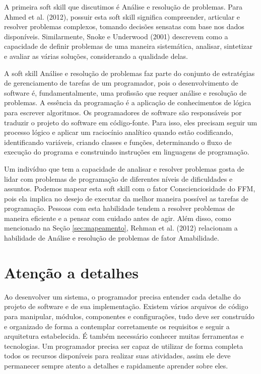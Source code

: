 A primeira soft skill que discutimos é Análise e resolução de problemas. Para Ahmed et al. (2012)\nocite{ahmed:12}, possuir esta soft skill significa compreender, articular e resolver problemas complexos, tomando decisões sensatas com base nos dados disponíveis. Similarmente, Snoke e Underwood (2001)\nocite{snoke:01} descrevem como a capacidade de definir problemas de uma maneira sistemática, analisar, sintetizar e avaliar as várias soluções, considerando a qualidade delas. 

A soft skill Análise e resolução de problemas faz parte do conjunto de estratégias de gerenciamento de tarefas de um programador, pois o desenvolvimento de software é, fundamentalmente, uma profissão que requer análise e resolução de problemas. A essência da programação é a aplicação de conhecimentos de lógica para escrever algoritmos. Os programadores de software são responsáveis por traduzir o projeto do software em código-fonte. Para isso, eles precisam seguir um processo lógico e aplicar um raciocínio analítico quando estão codificando, identificando variáveis, criando classes e funções, determinando o fluxo de execução do programa e construindo instruções em linguagens de programação. 

Um indivíduo que tem a capacidade de analisar e resolver problemas gosta de lidar com problemas de programação de diferentes níveis de dificuldades e assuntos.
Podemos mapear esta soft skill com o fator Conscienciosidade do FFM, pois ela implica no desejo de executar da melhor maneira possível as tarefas de programação.
Pessoas com esta habilidade tendem a resolver problemas de maneira eficiente e a pensar com cuidado antes de agir.
Além disso, como mencionado na Seção \ref{sec:mapeamento}, Rehman et al. (2012)\nocite{rehman:12}
relacionam a habilidade de Análise e resolução de problemas de fator Amabilidade.

\section{Atenção a detalhes}

Ao desenvolver um sistema, o programador precisa entender cada detalhe do projeto de software e de sua implementação. Existem vários arquivos de código para manipular, módulos, componentes e configurações, tudo deve ser construído e organizado de forma a contemplar corretamente os requisitos e seguir a arquitetura estabelecida. É também necessário conhecer muitas ferramentas e tecnologias. Um programador precisa ser capaz de utilizar de forma completa todos os recursos disponíveis para realizar suas atividades, assim ele deve permanecer sempre atento a detalhes e rapidamente aprender sobre eles.

